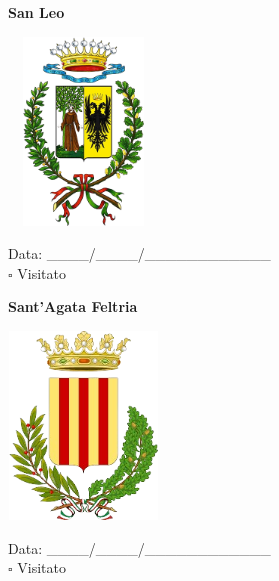 \documentclass[a5paper,12pt]{article}
\begin{document}
\vspace{0.7cm}

\noindent
\begin{minipage}[t]{0.45\textwidth}
    \begin{center}
        \textbf{San Leo}
    \end{center}
    \vspace{-0.5cm} %
    \begin{center}
        \includegraphics[height= 5cm, width=4cm]{Emilia Romagna/Stemma San Leo.png}
    \end{center}
    \vspace{-0.4cm} %
    \begin{flushleft}
        Data: \_\_\_\_/\_\_\_\_/\_\_\_\_\_\_\_\_\_\_\_\_ \\
        $\square$ Visitato
    \end{flushleft}
\end{minipage}
\hfill
\noindent
\begin{minipage}[t]{0.45\textwidth}
    \begin{center}
        \textbf{Sant'Agata Feltria}
    \end{center}
    \vspace{-0.5cm} %
    \begin{center}
        \includegraphics[height= 5cm, width=4cm]{Emilia Romagna/Stemma Sant Agata Feltria.png}
    \end{center}
    \vspace{-0.4cm} %
    \begin{flushleft}
        Data: \_\_\_\_/\_\_\_\_/\_\_\_\_\_\_\_\_\_\_\_\_ \\
        $\square$ Visitato
    \end{flushleft}
\end{minipage}
\end{document}
